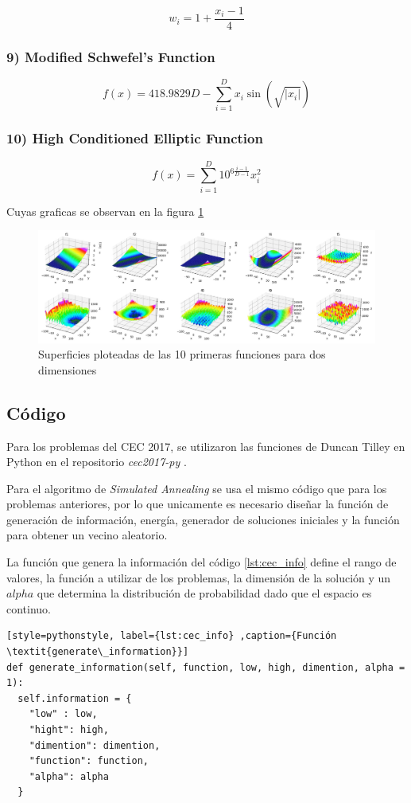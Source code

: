 \documentclass[12pt,twoside]{article}
\begin{document}
\[
w_i = 1 + \frac{x_i - 1}{4}
\]

\subsubsection*{9) Modified Schwefel's Function}
\[
f(x) = 418.9829 D - \sum_{i=1}^{D} x_i \sin(\sqrt{|x_i|})
\]

\subsubsection*{10) High Conditioned Elliptic Function}
\[
f(x) = \sum_{i=1}^{D} 10^{6 \frac{i-1}{D-1}} x_i^2
\]

Cuyas graficas se observan en la figura \ref{fig:cec}

\begin{figure}[H]
	\centering
	\includegraphics[width=1\linewidth]{img/cec}
	\caption{Superficies ploteadas de las 10 primeras funciones para dos dimensiones \cite{plot}}
	\label{fig:cec}
\end{figure}

\subsection{Código}

Para los problemas del CEC 2017, se utilizaron las funciones de Duncan Tilley en Python en el repositorio \textit{cec2017-py} \cite{git}.

Para el algoritmo de \textit{Simulated Annealing} se usa el mismo código que para los problemas anteriores, por lo que unicamente es necesario diseñar la función de generación de información, energía, generador de soluciones iniciales  y la función para obtener un vecino aleatorio.

La función que genera la información del código \ref{lst:cec_info} define el rango de valores, la función a utilizar de los problemas, la dimensión de la solución y un $alpha$ que determina la distribución de probabilidad dado que el espacio es continuo.

\begin{lstlisting}[style=pythonstyle, label={lst:cec_info} ,caption={Función \textit{generate\_information}}]
def generate_information(self, function, low, high, dimention, alpha = 1):
  self.information = {
	"low" : low,
	"hight": high,
	"dimention": dimention,
	"function": function,
	"alpha": alpha
  }
\end{lstlisting}
\end{document}
